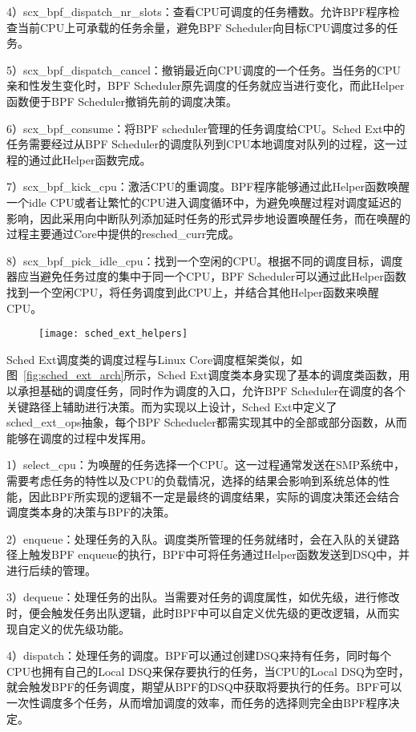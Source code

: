 4）scx\_bpf\_dispatch\_nr\_slots：查看CPU可调度的任务槽数。允许BPF程序检查当前CPU上可承载的任务余量，避免BPF Scheduler向目标CPU调度过多的任务。

5）scx\_bpf\_dispatch\_cancel：撤销最近向CPU调度的一个任务。当任务的CPU亲和性发生变化时，BPF Scheduler原先调度的任务就应当进行变化，而此Helper函数便于BPF Scheduler撤销先前的调度决策。

6）scx\_bpf\_consume：将BPF scheduler管理的任务调度给CPU。Sched Ext中的任务需要经过从BPF Scheduler的调度队列到CPU本地调度对队列的过程，这一过程的通过此Helper函数完成。

7）scx\_bpf\_kick\_cpu：激活CPU的重调度。BPF程序能够通过此Helper函数唤醒一个idle CPU或者让繁忙的CPU进入调度循环中，为避免唤醒过程对调度延迟的影响，因此采用向中断队列添加延时任务的形式异步地设置唤醒任务，而在唤醒的过程主要通过Core中提供的resched\_curr完成。

8）scx\_bpf\_pick\_idle\_cpu：找到一个空闲的CPU。根据不同的调度目标，调度器应当避免任务过度的集中于同一个CPU，BPF Scheduler可以通过此Helper函数找到一个空闲CPU，将任务调度到此CPU上，并结合其他Helper函数来唤醒CPU。

\begin{figure}[!htbp]
    \centering
    \texttt{[image: sched\_ext\_helpers]}
    \label{fig:sched_ext_helpers}
\end{figure}

Sched Ext调度类的调度过程与Linux Core调度框架类似，如图~\ref{fig:sched_ext_arch}所示，Sched Ext调度类本身实现了基本的调度类函数，用以承担基础的调度任务，同时作为调度的入口，允许BPF Scheduler在调度的各个关键路径上辅助进行决策。而为实现以上设计，Sched Ext中定义了sched\_ext\_ops抽象，每个BPF Schedueler都需实现其中的全部或部分函数，从而能够在调度的过程中发挥用。

1）select\_cpu：为唤醒的任务选择一个CPU。这一过程通常发送在SMP系统中，需要考虑任务的特性以及CPU的负载情况，选择的结果会影响到系统总体的性能，因此BPF所实现的逻辑不一定是最终的调度结果，实际的调度决策还会结合调度类本身的决策与BPF的决策。

2）enqueue：处理任务的入队。调度类所管理的任务就绪时，会在入队的关键路径上触发BPF enqueue的执行，BPF中可将任务通过Helper函数发送到DSQ中，并进行后续的管理。

3）dequeue：处理任务的出队。当需要对任务的调度属性，如优先级，进行修改时，便会触发任务出队逻辑，此时BPF中可以自定义优先级的更改逻辑，从而实现自定义的优先级功能。

4）dispatch：处理任务的调度。BPF可以通过创建DSQ来持有任务，同时每个CPU也拥有自己的Local DSQ来保存要执行的任务，当CPU的Local DSQ为空时，就会触发BPF的任务调度，期望从BPF的DSQ中获取将要执行的任务。BPF可以一次性调度多个任务，从而增加调度的效率，而任务的选择则完全由BPF程序决定。

